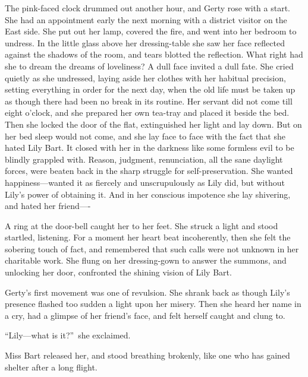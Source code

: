 \documentclass[12pt,a4paper]{book}
\begin{document}
The pink-faced clock drummed out another hour, and Gerty rose
with a start. She had an appointment early the next morning with
a district visitor on the East side. She put out her lamp,
covered the fire, and went into her bedroom to undress. In the
little glass above her dressing-table she saw her face reflected
against the shadows of the room, and tears blotted the
reflection. What right had she to dream the dreams of loveliness? 
A dull face invited a dull fate. She cried quietly as she
undressed, laying aside her clothes with her habitual precision,
setting everything in order for the next day, when the old life
must be taken up as though there had been no break in its
routine. Her servant did not come till eight o'clock, and she
prepared her own tea-tray and placed it beside the bed. Then she
locked the door of the flat, extinguished her light and lay down. 
But on her bed sleep would not come, and she lay face to face
with the fact that she hated Lily Bart. It closed with her in the
darkness like some formless evil to be blindly grappled with. 
Reason, judgment, renunciation, all the sane daylight forces,
were beaten back in the sharp struggle for self-preservation. She
wanted happiness---wanted it as fiercely and unscrupulously as Lily
did, but without Lily's power of obtaining it. And in her conscious
impotence she lay shivering, and hated her friend----





A ring at the door-bell caught her to her feet. She struck a
light and stood startled, listening. For a moment her heart beat
incoherently, then she felt the sobering touch of fact, and
remembered that such calls were not unknown in her charitable
work. She flung on her dressing-gown to answer the summons, and
unlocking her door, confronted the shining vision of Lily Bart.





Gerty's first movement was one of revulsion. She shrank back as
though Lily's presence flashed too sudden a light upon her
misery. Then she heard her name in a cry, had a glimpse of her
friend's face, and felt herself caught and clung to.





``Lily---what is it?''\ she exclaimed.





Miss Bart released her, and stood breathing brokenly, like one
who has gained shelter after a long flight.
\end{document}
